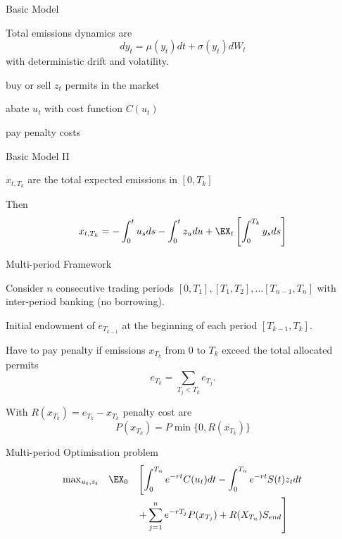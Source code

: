 {Basic Model}




\item<1-> Total emissions dynamics are
\begin{equation}
dy_t= \mu(y_t)dt + \sigma(y_t)dW_t
\end{equation}
with deterministic drift and volatility.
\item<2-> buy or sell $z_t$  permits in the market
\item<3-> abate $u_t$ with cost function $C(u_t)$
\item<4-> pay penalty costs





{Basic Model II}




\item<1-> $x_{t,T_k}$ are the total expected emissions in $[0,T_k]$
\item<2-> Then
\begin{equation}
x_{t,T_k}=-\int_0^tu_s ds  -\int_0^t z_u du + \EX_t\left[\int_0^{T_k} y_s ds \right]
\end{equation}





{Multi-period Framework}




\item<1-> Consider $n$ consecutive trading periods $[0,T_1], [T_1, T_2], \ldots [T_{n-1}, T_n]$ with inter-period banking (no borrowing).
\item<2-> Initial endowment of $e_{T_{k-1}}$ at the beginning of each period $[T_{k-1}, T_k]$.
\item<3-> Have to pay penalty if emissions $x_{T_k}$ from $0$ to $T_k$ exceed the total allocated permits
$$
e_{T_k}= \sum_{T_j < T_k}e_{T_j}.
$$
\item<4-> With $R(x_{T_k})=e_{T_k}-x_{T_k}$ penalty cost are
$$
P(x_{T_k}) = P \min\{0, R(x_{T_k})\}
$$





{Multi-period Optimisation problem}
$$
\begin{array}{lll}
\max_{u_t, z_t} & \EX_0& \left[ \displaystyle\int_0^{T_n}e^{-rt}C(u_t)dt - \int_0^{T_n}e^{-rt}S(t) z_tdt \right. \\*[12pt]
& & \displaystyle \left. + \sum_{j=1}^n e^{-rT_j}P(x_{T_j}) + R(X_{T_n}) S_{end}\right]
\end{array}
$$

